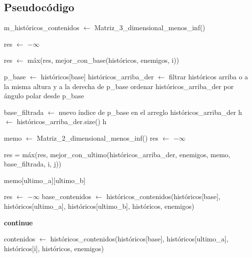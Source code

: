 \subsection{Pseudocódigo}
\begin{algorithmic}
	\State m_históricos_contenidos $\gets$ Matriz_3_dimensional_menos_inf() 

	\State res $\gets$ $-\infty$

		\State res $\gets$ máx(res, mejor_con_base(históricos, enemigos, i))
	\EndFor

\EndFunction

\vspace{2em}
	\State p_base $\gets$ históricos[base]
	\State históricos_arriba_der $\gets$ filtrar históricos arriba o a la misma altura y a la derecha de p_base
	\State ordenar históricos_arriba_der por ángulo polar desde p_base

	\State base_filtrada $\gets$ nuevo índice de p_base en el arreglo históricos_arriba_der
	\State h $\gets$ históricos_arriba_der.size()
		\State \Return h
	\EndIf

	\State memo $\gets$ Matriz_2_dimensional_menos_inf() 
	\State res $\gets$ $-\infty$

			 
				\State res = máx(res, mejor_con_ultimo(históricos_arriba_der, enemigos, memo, base_filtrada, i, j))
			\EndIf
		\EndFor
	\EndFor
\EndFunction
\vspace{2em}

		\State \Return memo[ultimo_a][ultimo_b]
	\EndIf

	\State res $\gets$ $-\infty$
	\State {} 
	\State base_contenidos $\gets$ históricos_contenidos(históricos[base], históricos[ultimo_a], históricos[ultimo_b], históricos, enemigos) 

				\State \textbf{continue}
			\EndIf

			\State contenidos $\gets$ históricos_contenidos(históricos[base], históricos[ultimo_a], históricos[i], históricos, enemigos)


\end{algorithmic}
